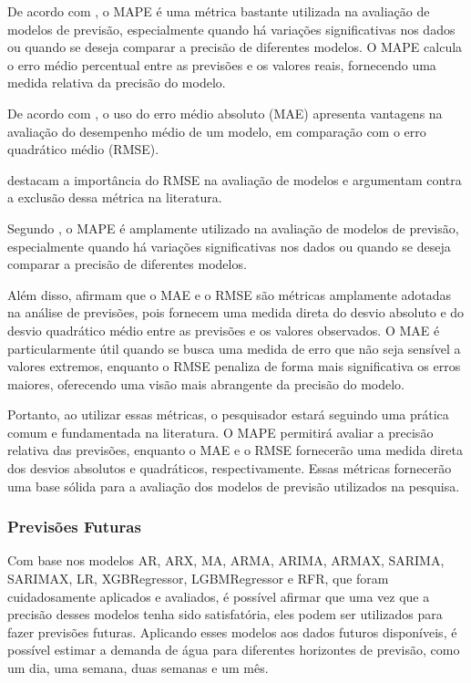 De acordo com , o MAPE é uma métrica bastante utilizada na avaliação de modelos de previsão, especialmente quando há variações significativas nos dados ou quando se deseja comparar a precisão de diferentes modelos. O MAPE calcula o erro médio percentual entre as previsões e os valores reais, fornecendo uma medida relativa da precisão do modelo.

De acordo com , o uso do erro médio absoluto (MAE) apresenta vantagens na avaliação do desempenho médio de um modelo, em comparação com o erro quadrático médio (RMSE).

 destacam a importância do RMSE na avaliação de modelos e argumentam contra a exclusão dessa métrica na literatura.

Segundo , o MAPE é amplamente utilizado na avaliação de modelos de previsão, especialmente quando há variações significativas nos dados ou quando se deseja comparar a precisão de diferentes modelos.

Além disso,  afirmam que o MAE e o RMSE são métricas amplamente adotadas na análise de previsões, pois fornecem uma medida direta do desvio absoluto e do desvio quadrático médio entre as previsões e os valores observados. O MAE é particularmente útil quando se busca uma medida de erro que não seja sensível a valores extremos, enquanto o RMSE penaliza de forma mais significativa os erros maiores, oferecendo uma visão mais abrangente da precisão do modelo.

Portanto, ao utilizar essas métricas, o pesquisador estará seguindo uma prática comum e fundamentada na literatura. O MAPE permitirá avaliar a precisão relativa das previsões, enquanto o MAE e o RMSE fornecerão uma medida direta dos desvios absolutos e quadráticos, respectivamente. Essas métricas fornecerão uma base sólida para a avaliação dos modelos de previsão utilizados na pesquisa.


\subsubsection{Previs\~oes Futuras}


Com base nos modelos AR, ARX, MA, ARMA, ARIMA, ARMAX, SARIMA, SARIMAX, LR, XGBRegressor, LGBMRegressor e RFR, que foram cuidadosamente aplicados e avaliados, é possível afirmar que uma vez que a precisão desses modelos tenha sido satisfatória, eles podem ser utilizados para fazer previsões futuras. Aplicando esses modelos aos dados futuros disponíveis, é possível estimar a demanda de água para diferentes horizontes de previsão, como um dia, uma semana, duas semanas e um mês.

